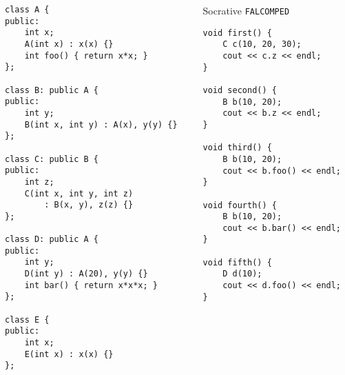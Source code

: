 \begin{frame}[fragile]
	\begin{columns}
		\begin{column}{0.5\textwidth}
			\begin{lstlisting}[basicstyle=\tiny\ttfamily]
class A {
public:
	int x;
	A(int x) : x(x) {}
	int foo() { return x*x; }
};

class B: public A {
public:
	int y;
	B(int x, int y) : A(x), y(y) {}
};

class C: public B {
public:
	int z;
	C(int x, int y, int z)
		: B(x, y), z(z) {}
};

class D: public A {
public:
	int y;
	D(int y) : A(20), y(y) {}
	int bar() { return x*x*x; }
};

class E {
public:
	int x;
	E(int x) : x(x) {}
};
			\end{lstlisting}
		\end{column}
		\begin{column}{0.46\textwidth}
			Socrative \texttt{FALCOMPED}
			\pause
			\begin{lstlisting}[basicstyle=\tiny\ttfamily]
void first() {
	C c(10, 20, 30);
	cout << c.z << endl;
}

void second() {
	B b(10, 20);
	cout << b.z << endl;
}

void third() {
	B b(10, 20);
	cout << b.foo() << endl;
}

void fourth() {
	B b(10, 20);
	cout << b.bar() << endl;
}

void fifth() {
	D d(10);
	cout << d.foo() << endl;
}
			\end{lstlisting}
		\end{column}
	\end{columns}
\end{frame}
